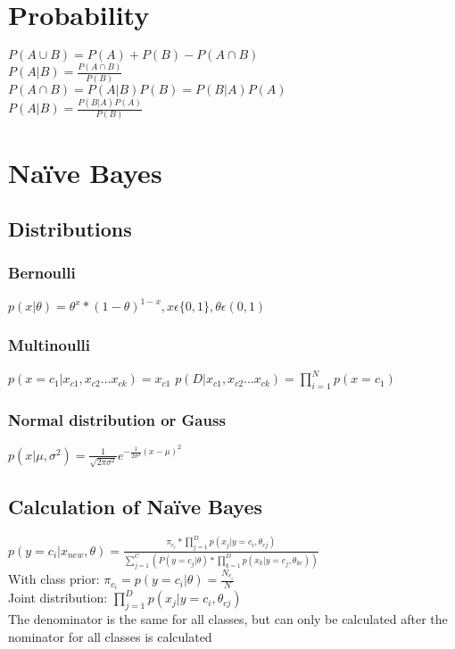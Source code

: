 \section{Probability}
$P(A \cup B) = P(A) + P(B) - P(A \cap B)$\\ $P(A|B)=\frac{P(A \cap B)}{P(B)}$\\
$P(A \cap B) = P(A|B)P(B) = P(B|A)P(A)$\\ $P(A|B)=\frac{P(B|A)P(A)}{P(B)}$
\section{Naïve Bayes}
\subsection{Distributions}
\subsubsection{Bernoulli}
$p(x|\theta)=\theta^{x}*(1-\theta)^{1-x}, x \epsilon \{0,1\}, \theta \epsilon (0,
1)$
\subsubsection{Multinoulli}
$p(x=c_{1}|x_{c1},x_{c2}\dots x_{ck})=x_{c1}$ $p(D|x_{c1},x_{c2}\dots x_{ck})=\prod
_{i=1}^{N}p(x=c_{1})$
\subsubsection{Normal distribution or Gauss}
$p(x|\mu, \sigma^{2})=\frac{1}{\sqrt{2\pi\sigma^{2}}}e^{-\frac{1}{2\sigma^{2}}(x-\mu)^2}$
\subsection{Calculation
of
Naïve
Bayes}
$p(y=c_{i}|x_{new}, \theta)=\frac{\pi_{c_{i}}*\prod_{j=1}^{D}p(x_{j}|y=c_{i},\theta_{cj})}{\sum_{j=1}^{C}\left(P(y=c_{j}|\theta)*
\prod_{k=1}^{D}p(x_{k}|y=c_{j},\theta_{kc})\right)}$\\ With class prior: $\pi_{c_{i}}
= p(y=c_{i}| \theta) = \frac{N_{c_{i}}}{N}$\\ Joint distribution: $\prod_{j=1}^{D}
p(x_{j}|y=c_{i},\theta_{cj})$\\ The denominator is the same for all classes, but
can only be calculated after the nominator for all classes is calculated
